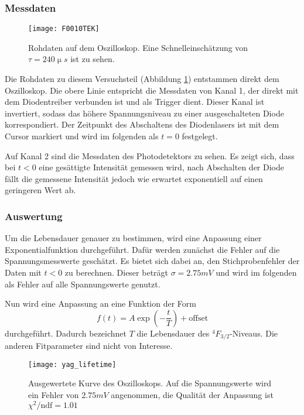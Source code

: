 \documentclass{../Misc/MontavonLaTeX/Montavon}
\newcommand{\halfwidth}{0.48\textwidth}
\begin{document}
\subsubsection{Messdaten}
\begin{figure}[htbp]
\centering
\texttt{[image: F0010TEK]}
\caption{Rohdaten auf dem Oszilloskop. Eine Schnelleinschätzung von $\tau = 240 \unit{\upmu s}$ ist zu sehen.}
\label{fig:lebensdauer_oszi}
\end{figure}

Die Rohdaten zu diesem Versuchsteil (Abbildung \ref{fig:lebensdauer_oszi}) entstammen direkt dem Oszilloskop. Die obere Linie entspricht die Messdaten von Kanal 1, der direkt mit dem Diodentreiber verbunden ist und als Trigger dient. Dieser Kanal ist invertiert, sodass das höhere Spannungsniveau zu einer ausgeschalteten Diode korrespondiert. Der Zeitpunkt des Abschaltens des Diodenlasers ist mit dem Cursor markiert und wird im folgenden als $t = 0$ festgelegt.

Auf Kanal 2 sind die Messdaten des Photodetektors zu sehen. Es zeigt sich, dass bei $t < 0$ eine gesättigte Intensität gemessen wird, nach Abschalten der Diode fällt die gemessene Intensität jedoch wie erwartet exponentiell auf einen geringeren Wert ab.

\subsubsection{Auswertung}
Um die Lebensdauer genauer zu bestimmen, wird eine Anpassung einer Exponentialfunktion durchgeführt. Dafür werden zunächst die Fehler auf die Spannungsmesswerte geschätzt. Es bietet sich dabei an, den Stichprobenfehler der Daten mit $t < 0$ zu berechnen. Dieser beträgt $\sigma = 2.75 \unit{mV}$ und wird im folgenden als Fehler auf alle Spannungswerte genutzt.

Nun wird eine Anpassung an eine Funktion der Form 
\[ f(t) = A \exp\left(-\frac{t}{T}\right) + \textrm{offset} \] durchgeführt. Dadurch bezeichnet $T$ die Lebensdauer des $^4F_{3/2}$-Niveaus. Die anderen Fitparameter sind nicht von Interesse.

\begin{figure}[htbp]
\centering
\texttt{[image: yag\_lifetime]}
\caption{Ausgewertete Kurve des Oszilloskops. Auf die Spannungswerte wird ein Fehler von $2.75 \unit{mV}$ angenommen, die Qualität der Anpassung ist $\chi^2 / \textrm{ndf} = 1.01$}
\label{fig:lebensdauer_fit}
\end{figure}
\end{document}
